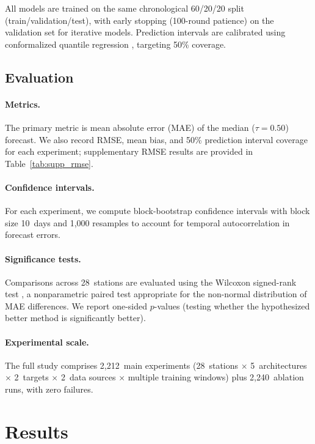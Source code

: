 \documentclass{ametsocV6.1}
\begin{document}
All models are trained on the same chronological 60/20/20 split (train/validation/test),
with early stopping (100-round patience) on the validation set for iterative models.
Prediction intervals are calibrated using conformalized quantile regression
\citep{romano2019conformal}, targeting 50\% coverage.

\subsection{Evaluation}
\label{sec:evaluation}

\paragraph{Metrics.}
The primary metric is mean absolute error (MAE) of the median ($\tau = 0.50$)
forecast. We also record RMSE, mean bias, and 50\% prediction interval coverage
for each experiment; supplementary RMSE results are provided in Table~\ref{tab:supp_rmse}.

\paragraph{Confidence intervals.}
For each experiment, we compute block-bootstrap confidence intervals
\citep{kunsch1989jackknife} with block size 10~days and 1{,}000 resamples to
account for temporal autocorrelation in forecast errors.

\paragraph{Significance tests.}
Comparisons across 28~stations are evaluated using the Wilcoxon signed-rank test
\citep{wilcoxon1945individual}, a nonparametric paired test appropriate for the
non-normal distribution of MAE differences. We report one-sided $p$-values
(testing whether the hypothesized better method is significantly better).

\paragraph{Experimental scale.}
The full study comprises 2{,}212~main experiments (28~stations $\times$
5~architectures $\times$ 2~targets $\times$ 2~data sources $\times$ multiple
training windows) plus 2{,}240~ablation runs, with zero failures.

\section{Results}
\label{sec:results}
\end{document}
